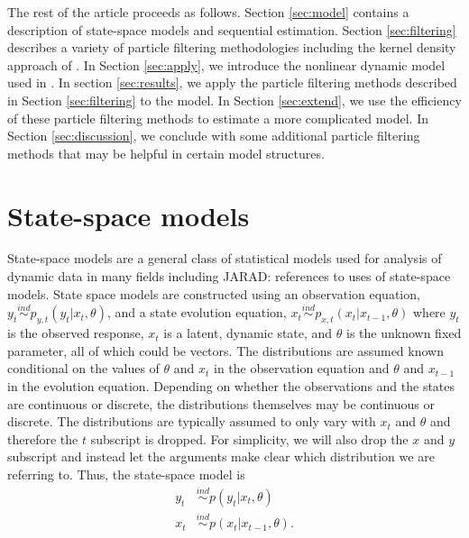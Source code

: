 \documentclass{elsarticle}
\newcommand{\jarad}[1]{{\color{red}JARAD: #1}}
\begin{document}
The rest of the article proceeds as follows. Section \ref{sec:model} contains a description of state-space models and sequential estimation. Section \ref{sec:filtering} describes a variety of particle filtering methodologies including the kernel density approach of \cite{Liu:West:comb:2001}.  In Section \ref{sec:apply}, we introduce the nonlinear dynamic model used in \citet{skvortsov2012monitoring}. In section \ref{sec:results}, we apply the particle filtering methods described in Section \ref{sec:filtering} to the \citet{skvortsov2012monitoring} model.  In Section \ref{sec:extend}, we use the efficiency of these particle filtering methods to estimate a more complicated model.  In Section \ref{sec:discussion}, we conclude with some additional particle filtering methods that may be helpful in certain model structures.

\section{State-space models \label{sec:model}}

State-space models are a general class of statistical models used for analysis of dynamic data in many fields including \jarad{references to uses of state-space models}. State space models are constructed using an observation equation, $y_t \stackrel{ind}{\sim} p_{y,t}(y_t|x_t,\theta)$, and a state evolution equation, $x_t \stackrel{ind}{\sim} p_{x,t}(x_t|x_{t-1},\theta)$ where $y_t$ is the observed response, $x_t$ is a latent, dynamic state, and $\theta$ is the unknown fixed parameter, all of which could be vectors. The distributions are assumed known conditional on the values of $\theta$ and $x_t$ in the observation equation and $\theta$ and $x_{t-1}$ in the evolution equation. Depending on whether the observations and the states are continuous or discrete, the distributions themselves may be continuous or discrete. The distributions are typically assumed to only vary with $x_t$ and $\theta$ and therefore the $t$ subscript is dropped.
For simplicity, we will also drop the $x$ and $y$ subscript and instead let the arguments make clear which distribution we are referring to. Thus, the state-space model is
\begin{align*}
y_t &\stackrel{ind}{\sim} p(y_t|x_t,\theta) \\
x_t &\stackrel{ind}{\sim} p(x_t|x_{t-1},\theta).
\end{align*}
\end{document}
